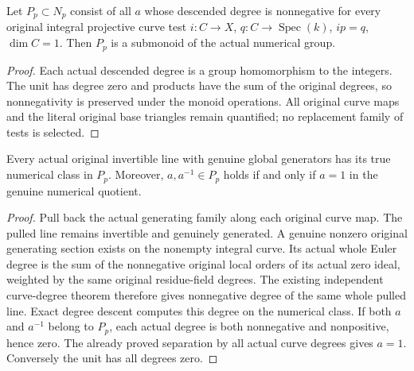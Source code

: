 \begin{definition}
\label{def:seven-native-curve-nef-classes}
\leanok
{}
Let $P_p\subset N_p$ consist of all $a$ whose descended degree is
nonnegative for every original integral projective curve test
$i:C\to X$, $q:C\to\operatorname{Spec}(k)$, $ip=q$, $\dim C=1$.
Then $P_p$ is a submonoid of the actual numerical group.
\end{definition}
\begin{proof}
Each actual descended degree is a group homomorphism to the integers.
The unit has degree zero and products have the sum of the original
degrees, so nonnegativity is preserved under the monoid operations.
All original curve maps and the literal original base triangles remain
quantified; no replacement family of tests is selected.
\end{proof}

\begin{theorem}
\label{thm:seven-native-generated-curve-nef-pointed}
\leanok
{}
Every actual original invertible line with genuine global generators has
its true numerical class in $P_p$. Moreover, $a,a^{-1}\in P_p$ holds
if and only if $a=1$ in the genuine numerical quotient.
\end{theorem}
\begin{proof}
Pull back the actual generating family along each original curve map.
The pulled line remains invertible and genuinely generated. A genuine
nonzero original generating section exists on the nonempty integral
curve. Its actual whole Euler degree is the sum of the nonnegative
original local orders of its actual zero ideal, weighted by the same
original residue-field degrees. The existing independent curve-degree
theorem therefore gives nonnegative degree of the same whole pulled
line. Exact degree descent computes this degree on the numerical class.
If both $a$ and $a^{-1}$ belong to $P_p$, each actual degree is both
nonnegative and nonpositive, hence zero. The already proved separation
by all actual curve degrees gives $a=1$. Conversely the unit has all
degrees zero.
\end{proof}


